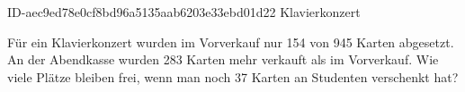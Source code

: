 \begin{exercise}
      {ID-aec9ed78e0cf8bd96a5135aab6203e33ebd01d22}
      {Klavierkonzert}
  \ifproblem\problem\par
    Für ein Klavierkonzert wurden im Vorverkauf nur 154 von 945 Karten abgesetzt.
    An der Abendkasse wurden 283 Karten mehr verkauft als im Vorverkauf. Wie viele
    Plätze bleiben frei, wenn man noch 37 Karten an Studenten verschenkt hat?
  \fi
\end{exercise}
